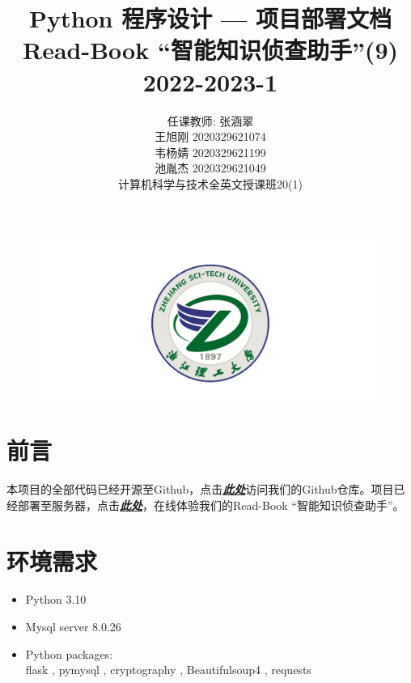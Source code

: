 \documentclass[twoside,11pt]{article}
\newcommand\studentName{\Large \centering 任课教师: 张涵翠\\王旭刚 2020329621074\\韦杨婧 2020329621199\\池胤杰 2020329621049\\计算机科学与技术全英文授课班20(1)\\}
\begin{document}
\begin{figure}[H]
    \centering
    \includegraphics[width=1\columnwidth]{figures/zstu-logo.png}
\end{figure}

\title{\Huge Python 程序设计  --- 项目部署文档\\ \vspace{1.5cm} Read-Book ``智能知识侦查助手''(9) \\ \vspace{1.5cm} \huge 2022-2023-1 \\ \vspace{0.8cm}}

\author{\name \studentName{}
    \addr
}

\maketitle
\thispagestyle{empty}
\newpage
{}
\section{前言}
本项目的全部代码已经开源至Github，点击\href{https://github.com/Casta-mere/Read-Book}{\textbf{\emph{此处}}}访问我们的Github仓库。项目已经部署至服务器，点击\href{http://47.116.46.195/}{\textbf{\emph{此处}}}，在线体验我们的Read-Book ``智能知识侦查助手''。

\section{环境需求}
\begin{itemize}
    \item Python 3.10
    \item Mysql server 8.0.26
    \item Python packages:\\
          flask
          , pymysql
          , cryptography
          , Beautifulsoup4
          , requests
\end{itemize}
\end{document}
